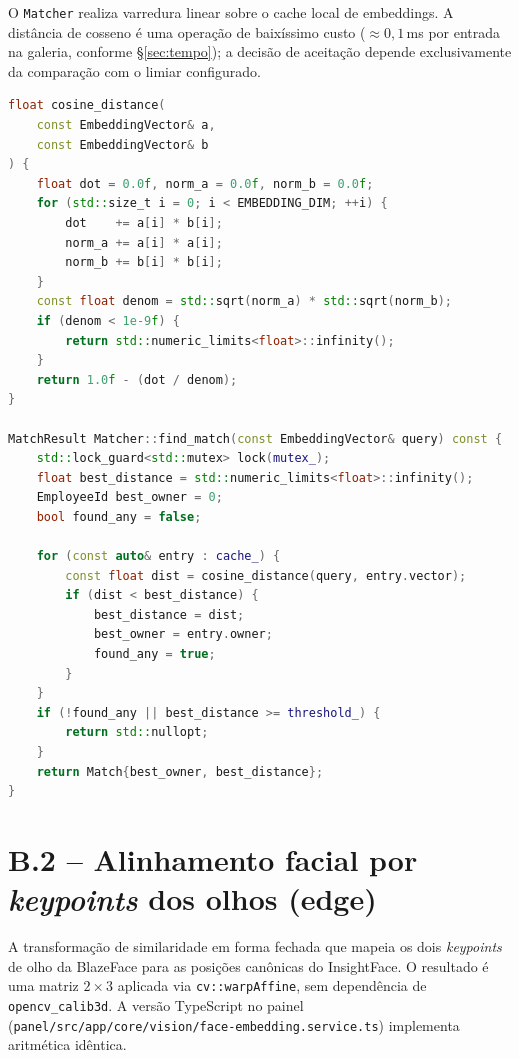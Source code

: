\documentclass[12pt,a4paper]{report}
\begin{document}
O \texttt{Matcher} realiza varredura linear sobre o cache local de
embeddings. A distância de cosseno é uma operação de baixíssimo custo
($\approx 0{,}1$\,ms por entrada na galeria, conforme
§\ref{sec:tempo}); a decisão de aceitação depende exclusivamente da
comparação com o limiar configurado.

\begin{lstlisting}[language=C++,caption={edge/src/vision/matcher.cpp},label={lst:matcher}]
float cosine_distance(
    const EmbeddingVector& a,
    const EmbeddingVector& b
) {
    float dot = 0.0f, norm_a = 0.0f, norm_b = 0.0f;
    for (std::size_t i = 0; i < EMBEDDING_DIM; ++i) {
        dot    += a[i] * b[i];
        norm_a += a[i] * a[i];
        norm_b += b[i] * b[i];
    }
    const float denom = std::sqrt(norm_a) * std::sqrt(norm_b);
    if (denom < 1e-9f) {
        return std::numeric_limits<float>::infinity();
    }
    return 1.0f - (dot / denom);
}

MatchResult Matcher::find_match(const EmbeddingVector& query) const {
    std::lock_guard<std::mutex> lock(mutex_);
    float best_distance = std::numeric_limits<float>::infinity();
    EmployeeId best_owner = 0;
    bool found_any = false;

    for (const auto& entry : cache_) {
        const float dist = cosine_distance(query, entry.vector);
        if (dist < best_distance) {
            best_distance = dist;
            best_owner = entry.owner;
            found_any = true;
        }
    }
    if (!found_any || best_distance >= threshold_) {
        return std::nullopt;
    }
    return Match{best_owner, best_distance};
}
\end{lstlisting}

\section*{B.2 -- Alinhamento facial por \textit{keypoints} dos olhos
(edge)}

A transformação de similaridade em forma fechada que mapeia os dois
\textit{keypoints} de olho da BlazeFace para as posições canônicas do
InsightFace. O resultado é uma matriz $2\times3$ aplicada via
\texttt{cv::warpAffine}, sem dependência de
\texttt{opencv\_calib3d}. A versão TypeScript no painel
(\texttt{panel/src/app/core/vision/face-embedding.service.ts})
implementa aritmética idêntica.
\end{document}

